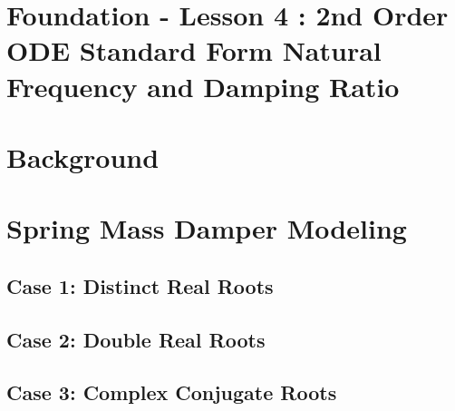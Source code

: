 \documentclass[12pt,a4paper]{article}
\begin{document}
	\section*{\centering Foundation - Lesson 4 : 2nd Order ODE Standard Form Natural Frequency and Damping Ratio}
	
	\section{Background}
	\section{Spring Mass Damper Modeling}
	\subsection{Case 1: Distinct Real Roots}
	\subsection{Case 2: Double Real Roots}
	\subsection{Case 3: Complex Conjugate Roots}
	
\end{document}
